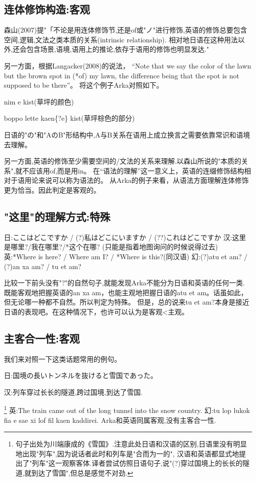 \subsection{连体修饰构造:客观}

森山(2007)提"「不论是用连体修饰节,还是of或"ノ"进行修饰,英语的修饰总要包含空间,逻辑,文法之类本质的关系(intrinsic relationship).
相对地日语在这种用法以外,还会包含场景,语境,语用上的推论,依存于语用的修饰也明显发达."

另一方面，根据Langacker(2008)的说法，
“Note that we say the color of the lawn but the brown spot in (*of) my lawn, 
the difference being that the spot is not supposed to be there”。
将这个例子Arka对照如下。

nim e kist(草坪的颜色)

boppo lette kaen\{?e\} kist(草坪棕色的部分)

日语的"の"和"AのB"形结构中,A与B关系在语用上成立换言之需要依靠常识和语境去理解。

另一方面,英语的修饰至少需要空间的/文法的关系来理解.以森山所说的"本质的关系",就不应该用of,而是用in。
在“语法的理解”这一意义上，英语的连缀修饰结构相对于语用论来说可以称为语法的。
从Arka的例子来看，从语法方面理解连体修饰更为恰当。因此判定是客观的。

\subsection{"这里"的理解方式:特殊}

日:ここはどこですか / (?)私はどこにいますか / (??)これはどこですか
汉:这里是哪里?/我在哪里?/*这个在哪?	(只能是指着地图询问的时候说得过去)
英:*Where is here? / Where am I? / *Where is this?(同汉语)
幻:(?)atu et am? / (?)an xa am? / tu et am?

比较一下前头没有"?"的自然句子,就能发现Arka不能分为日语和英语的任何一类.
既能客观地把握英语的an xa am，也能主观地把握日语的atu et am。话虽如此，但无论哪一种都不自然。所以判定为特殊。
但是，总的说来tu et am?本身是接近日语的表现吧。在这种情况下，也许可以认为是客观<主观。
\subsection{主客合一性:客观}

我们来对照一下这类话题常用的例句。
{\kaishu
日:国境の長いトンネルを抜けると雪国であった。

汉:列车穿过长长的隧道,跨过国境,到达了雪国.}
\footnote{句子出处为川端康成的《雪国》.注意此处日语和汉语的区别,日语里没有明显地出现"列车",因为说话者此时和列车是"合而为一的",
汉语和英语都显式地提出了"列车"这一观察客体.译者尝试仿照日语句子,说"(?)穿过国境上的长长的隧道,就到达了雪国",但总是感觉不对劲.
}
{\kaishu
英:The train came out of the long tunnel into the snow country.
幻:tu lop lukok fia e sae xi lof fil kaen kaddirei.
}
Arka和英语同属客观,没有主客合一性.

